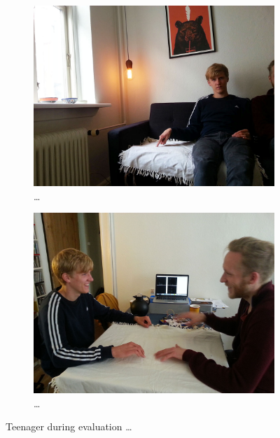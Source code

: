 \begin{figure}
        \begin{subfigure}[b]{0.44\textwidth}
                \centering
                \includegraphics[width=\textwidth]{figures/touch/evaluation/sebastian/sofa_infront_seb}
                \caption{\dots}
                \label{fig:textiletouch:eval:sebastian:sofa_front}
        \end{subfigure}%
        \hspace{0.02\textwidth}
        \begin{subfigure}[b]{0.44\textwidth}
                \centering
                \includegraphics[width=\textwidth]{figures/touch/evaluation/sebastian/table}
                \caption{\dots}
                \label{fig:textiletouch:eval:sebastian:table}
        \end{subfigure}
        \caption{Teenager during evaluation \dots}
        \label{fig:textiletouch:eval:sebastian}
\end{figure}

